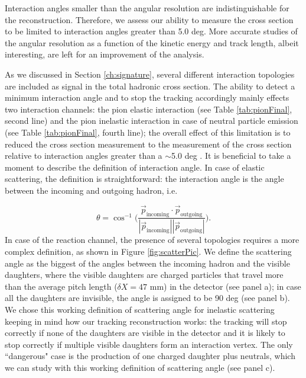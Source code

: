 Interaction angles smaller than the angular resolution are indistinguishable for the reconstruction. Therefore, we assess our ability to measure the cross section to be limited to interaction angles greater than 5.0 deg. More accurate studies of the angular resolution as a function of the kinetic energy and track length, albeit interesting, are left for an improvement of the analysis.  

As we discussed in Section \ref{ch:signature}, several different interaction topologies are included as signal in the total hadronic cross section. The ability to detect a minimum interaction angle  and to stop the tracking accordingly mainly effects two interaction channels: the pion elastic interaction (see Table \ref{tab:pionFinal}, second line) and the pion inelastic interaction in case of neutral particle emission (see Table \ref{tab:pionFinal}, fourth line); the overall effect of this limitation is to reduced the cross section measurement to the measurement of the cross section relative to interaction angles greater than a $\sim$5.0 deg .
It is beneficial to take a moment to describe the definition of interaction angle.  In case of elastic scattering, the definition is straightforward: the interaction angle is the angle between the incoming and outgoing hadron, i.e.

\begin{equation}  
\theta = \cos^{-1} \Big(\frac{\vec p _{\text{incoming}}  \cdot\vec p _{\text{outgoing}}}{|\vec p _{\text{incoming}}|  |\vec p _{\text{outgoing}}| }\Big).
\end{equation}   
In case of the reaction channel,  the presence of several topologies requires a more complex definition, as shown in Figure \ref{fig:scatterPic}.  We define the scattering angle as the biggest of the angles between the incoming hadron and the visible daughters, where the visible daughters are charged particles that travel more than the average pitch length ($\delta X = 47$ mm) in the detector (see panel a); in case all the daughters are invisible, the angle is assigned to be 90 deg (see panel b). We chose this working definition of scattering angle for inelastic scattering keeping in mind how our tracking reconstruction works: the tracking will stop correctly if none of the daughters are visible in the detector and it is likely to stop correctly if multiple visible daughters form an interaction vertex. The only ``dangerous" case is the production of one charged daughter plus neutrals, which we can study with this working definition of scattering angle (see panel c).


